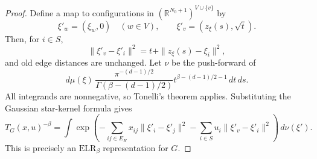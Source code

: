 \documentclass[10pt,a4paper]{amsart}
\newcommand{\ELR}{\mathrm{ELR}}
\newcommand{\R}{\mathbb{R}}
\begin{document}
\begin{proof}
Define a map to configurations in \((\R^{N_0+1})^{V\cup\{v\}}\) by
\begin{equation}
        \xi'_w=(\xi_w,0)\quad (w\in V),
        \qquad
        \xi'_v=(z_{\xi}(s),\sqrt t).
\end{equation}
Then, for \(i\in S\),
\begin{equation}
        \|\xi'_v-\xi'_i\|^2=t+\|z_{\xi}(s)-\xi_i\|^2,
\end{equation}
and old edge distances are unchanged.  Let \(\nu\) be the push-forward of
\begin{equation}
        d\mu(\xi)\,
        \frac{\pi^{-(d-1)/2}}{\Gamma(\beta-(d-1)/2)}
        t^{\beta-(d-1)/2-1}\,dt\,ds .
\end{equation}
All integrands are nonnegative, so Tonelli's theorem applies.  Substituting the Gaussian star-kernel formula gives
\begin{equation}
        T_G(x,u)^{-\beta}
        =
        \int
        \exp\left(
        -\sum_{ij\in E_H}x_{ij}\|\xi'_i-\xi'_j\|^2
        -\sum_{i\in S}u_i\|\xi'_v-\xi'_i\|^2
        \right)\,d\nu(\xi').
\end{equation}
This is precisely an \(\ELR_\beta\) representation for \(G\).
\end{proof}
\end{document}
